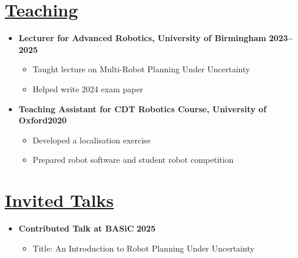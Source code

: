 \documentclass[11pt]{article}
\begin{document}
\section*{\underline{Teaching}}
\begin{itemize}
\item \textbf{Lecturer for Advanced Robotics, University of Birmingham} \hfill  \textbf{2023--2025}
\begin{itemize}
\item Taught lecture on Multi-Robot Planning Under Uncertainty
\item Helped write 2024 exam paper
\end{itemize}
\item \textbf{Teaching Assistant for CDT Robotics Course, University of Oxford}\hfill \textbf{2020}
\begin{itemize}
\item Developed a localisation exercise
\item Prepared robot software and student robot competition
\end{itemize}
\end{itemize}

\section*{\underline{Invited Talks}}
\begin{itemize}
\item \textbf{Contributed Talk at BASiC} \hfill \textbf{2025}
\begin{itemize}
\item Title: An Introduction to Robot Planning Under Uncertainty
\end{itemize}
\end{itemize}

\iffalse
\end{document}
